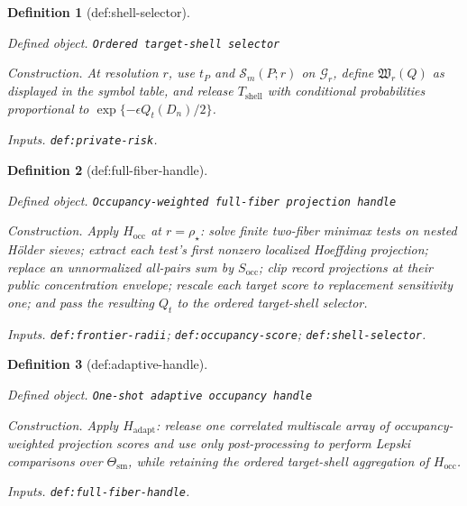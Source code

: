 \documentclass{article}
\newtheorem{definition}{Definition}
\begin{document}
\begin{definition}[def:shell-selector]\label{def:shell-selector}
\par\smallskip\noindent\emph{Defined object.} \texttt{Ordered target-\allowbreak{}shell selector}
\par\smallskip\noindent\emph{Construction.} At resolution \(r\), use \(t_P\) and \(\mathcal S_m(P;r)\) on \(\mathcal G_r\), define \(\mathfrak W_r(Q)\) as displayed in the symbol table, and release \(T_{\mathrm{shell}}\) with conditional probabilities proportional to \(\exp\{-\epsilon Q_t(D_n)/2\}\).
\par\smallskip\noindent\emph{Inputs.} \texttt{def:\allowbreak{}private-\allowbreak{}risk}.
\end{definition}

\begin{definition}[def:full-fiber-handle]\label{def:full-fiber-handle}
\par\smallskip\noindent\emph{Defined object.} \texttt{Occupancy-\allowbreak{}weighted full-\allowbreak{}fiber projection handle}
\par\smallskip\noindent\emph{Construction.} Apply \(H_{\mathrm{occ}}\) at \(r=\rho_\star\): solve finite two-fiber minimax tests on nested Hölder sieves; extract each test's first nonzero localized Hoeffding projection; replace an unnormalized all-pairs sum by \(S_{\mathrm{occ}}\); clip record projections at their public concentration envelope; rescale each target score to replacement sensitivity one; and pass the resulting \(Q_t\) to the ordered target-shell selector.
\par\smallskip\noindent\emph{Inputs.} \texttt{def:\allowbreak{}frontier-\allowbreak{}radii}; \texttt{def:\allowbreak{}occupancy-\allowbreak{}score}; \texttt{def:\allowbreak{}shell-\allowbreak{}selector}.
\end{definition}

\begin{definition}[def:adaptive-handle]\label{def:adaptive-handle}
\par\smallskip\noindent\emph{Defined object.} \texttt{One-\allowbreak{}shot adaptive occupancy handle}
\par\smallskip\noindent\emph{Construction.} Apply \(H_{\mathrm{adapt}}\): release one correlated multiscale array of occupancy-weighted projection scores and use only post-processing to perform Lepski comparisons over \(\Theta_{\mathrm{sm}}\), while retaining the ordered target-shell aggregation of \(H_{\mathrm{occ}}\).
\par\smallskip\noindent\emph{Inputs.} \texttt{def:\allowbreak{}full-\allowbreak{}fiber-\allowbreak{}handle}.
\end{definition}
\end{document}

